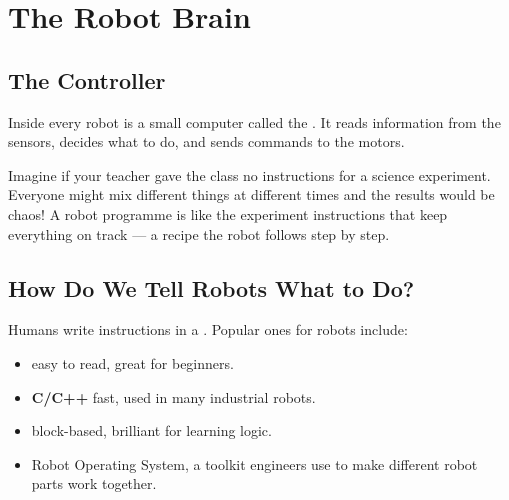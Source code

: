 
\chapter{The Robot Brain}


\section*{The Controller}

Inside every robot is a small computer called the .
It reads information from the sensors, decides what to do, and sends
commands to the motors.

\begin{picturethis}
  Imagine if your teacher gave the class no instructions for a science
  experiment. Everyone might mix different things at different times and
  the results would be chaos! A robot programme is like the experiment
  instructions that keep everything on track --- a recipe the robot
  follows step by step.
\end{picturethis}


\sectionrule

\section*{How Do We Tell Robots What to Do?}

Humans write instructions in a . Popular ones
for robots include:

\begin{itemize}
  \item \textbf{} \textemdash{} easy to read, great for beginners.
  \item \textbf{C/C++} \textemdash{} fast, used in many industrial robots.
  \item \textbf{} \textemdash{} block-based, brilliant for learning logic.
  \item \textbf{} \textemdash{} Robot Operating System, a toolkit engineers use to
    make different robot parts work together.
\end{itemize}

